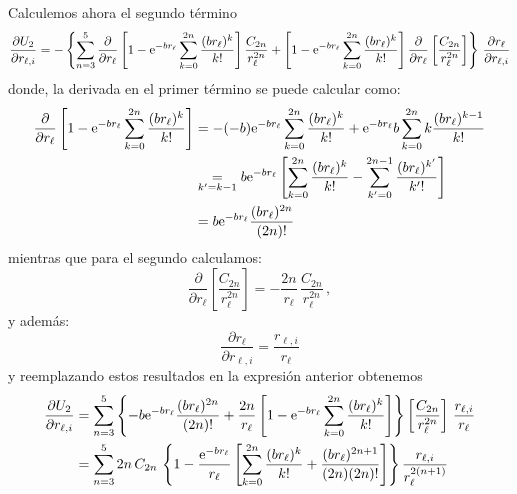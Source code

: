 Calculemos ahora el segundo t\'{e}rmino
\begin{equation*}
  \frac{\partial U_{2}}{\partial r_{\ell,i}} = - \left\{\sum_{n=3}^{5} \frac{\partial}{\partial r_{\ell}}\left[ 1 - \mathrm{e}^{-br_{\ell}} \sum_{k=0}^{2n}\frac{(br_{\ell})^{k}}{k!}\right] \frac{C_{2n}}{r_{\ell}^{2n}} + \left[ 1 - \mathrm{e}^{-br_{\ell}} \sum_{k=0}^{2n}\frac{(br_{\ell})^{k}}{k!}\right] \frac{\partial}{\partial r_{\ell}}\left[ \frac{C_{2n}}{r_{\ell}^{2n}}\right] \right\} \, \frac{\partial r_{\ell}}{\partial r_{\ell,i}}
\end{equation*}
%
donde, la derivada en el primer t\'{e}rmino se puede calcular como:
\begin{align*}
 \frac{\partial}{\partial r_{\ell}}\left[ 1 - \mathrm{e}^{-br_{\ell}} \sum_{k=0}^{2n}\frac{(br_{\ell})^{k}}{k!}\right] &= - (-b) \mathrm{e}^{-br_{\ell}} \sum_{k=0}^{2n}\frac{(br_{\ell})^{k}}{k!} +  \mathrm{e}^{-br_{\ell}} b \, { \sum_{k=0}^{2n}  k \frac{(br_{\ell})^{k-1}}{k!}} \\
&\mathrel{\mathop{\kern0pt=}\limits_{k'=k-1}}  b \mathrm{e}^{-br_{\ell}} \left[\sum_{k=0}^{2n}\frac{(br_{\ell})^{k}}{k!} - \sum_{k'=0}^{2n-1} \frac{(br_{\ell})^{k'}}{k'!}\right] 
\\
&=  b \mathrm{e}^{-br_{\ell}} \frac{(b r_{\ell})^{2n}}{(2n)!}
\end{align*}
%
mientras que para el segundo calculamos:
\begin{equation*}
 \frac{\partial}{\partial r_{\ell}}\left[ \frac{C_{2n}}{r_{\ell}^{2n}}\right] = -\frac{2n}{r_{\ell}}\, \frac{C_{2n}}{r_{\ell}^{2n}} \,,
\end{equation*}
y adem\'{a}s:
\begin{equation*}
  \frac{\partial r_{\ell}}{\partial r_{\ell,i}} = \frac{r_{\ell,i}}{r_{\ell}}
\end{equation*}
%
y reemplazando estos resultados en la expresi\'{o}n anterior obtenemos
\begin{align}\label{Q:pot-inter-dU2}
  \frac{\partial U_{2}}{\partial r_{\ell,i}} &= \sum_{n=3}^{5} \left\{ -b \mathrm{e}^{-br_{\ell}} \frac{(b r_{\ell})^{2n}}{(2n)!} + \frac{2n}{r_{\ell}} \left[ 1 - \mathrm{e}^{-br_{\ell}} \sum_{k=0}^{2n}\frac{(br_{\ell})^{k}}{k!}\right] \right\}  \left[ \frac{C_{2n}}{r_{\ell}^{2n}}\right]\, \frac{r_{\ell,i}}{r_{\ell}} \nonumber \\
 &=  \sum_{n=3}^{5} 2 n\, C_{2n} \,\left\{1 - \frac{\mathrm{e}^{-br_{\ell}}}{r_{\ell}}  \left[ \sum_{k=0}^{2n}\frac{(br_{\ell})^{k}}{k!} + \frac{(br_{\ell})^{2n+1}}{(2n)(2n)!} \right] \right\} \frac{r_{\ell,i}}{r_{\ell}^{2(n+1)}}
\end{align}

